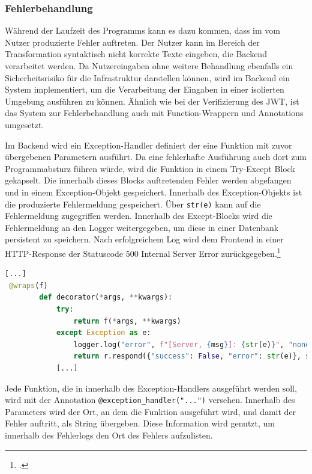 \subsubsection{Fehlerbehandlung}
Während der Laufzeit des Programms kann es dazu kommen, dass im vom Nutzer produzierte Fehler auftreten. Der Nutzer kann im Bereich der Transformation syntaktisch nicht korrekte Texte eingeben, die Backend verarbeitet werden. Da Nutzereingaben ohne weitere Behandlung ebenfalls ein Sicherheitsrisiko für die Infrastruktur darstellen können, wird im Backend ein System implementiert, um die Verarbeitung der Eingaben in einer isolierten Umgebung ausführen zu können. Ähnlich wie bei der Verifizierung des JWT, ist das System zur Fehlerbehandlung auch mit Function-Wrappern und Annotations umgesetzt. 

Im Backend wird ein Exception-Handler definiert der eine Funktion mit zuvor übergebenen Parametern ausführt. Da eine fehlerhafte Ausführung auch dort zum Programmabsturz führen würde, wird die Funktion in einem Try-Except Block gekapselt. Die innerhalb dieses Blocks auftretenden Fehler werden abgefangen und in einem Exception-Objekt gespeichert. Innerhalb des Exception-Objekts ist die produzierte Fehlermeldung gespeichert. Über \texttt{str(e)} kann auf die Fehlermeldung zugegriffen werden. Innerhalb des Except-Blocks wird die Fehlermeldung an den Logger weitergegeben, um diese in einer Datenbank persistent zu speichern. Nach erfolgreichem Log wird dem Frontend in einer HTTP-Response der Statuscode 500 \glqq Internal Server Error\grqq{} zurückgegeben.\footcite{fielding1999rfc2616}

\begin{lstlisting}[language=Python, caption={Exception-Handling mithilfe von Wrappern}]
[...]
 @wraps(f)
        def decorator(*args, **kwargs):
            try:
                return f(*args, **kwargs)
            except Exception as e:
                logger.log("error", f"[Server, {msg}]: {str(e)}", "none")
                return r.respond({"success": False, "error": str(e)}, status=500)
            [...]
\end{lstlisting}

Jede Funktion, die in innerhalb des Exception-Handlers ausgeführt werden soll, wird mit der Annotation \texttt{@exception\_{}handler("...")} versehen. Innerhalb des Parameters wird der Ort, an dem die Funktion ausgeführt wird, und damit der Fehler auftritt, als String übergeben. Diese Information wird genutzt, um innerhalb des Fehlerlogs den Ort des Fehlers aufzulisten.

